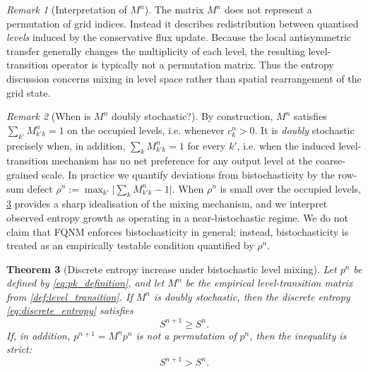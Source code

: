 \documentclass[sn-basic]{sn-jnl}
\theoremstyle{plain}
\newtheorem{theorem}{Theorem}[section]
\theoremstyle{remark}
\newtheorem{remark}[theorem]{Remark}
\begin{document}
\begin{remark}[Interpretation of $M^n$]
\label{rem:M_interpretation}
The matrix $M^n$ does not represent a permutation of grid indices. 
Instead it describes redistribution between quantised \emph{levels} induced by the conservative flux update.
Because the local antisymmetric transfer generally changes the multiplicity of each level, the resulting level-transition operator is typically not a permutation matrix. 
Thus the entropy discussion concerns mixing in level space rather than spatial rearrangement of the grid state.
\end{remark}

\begin{remark}[When is $M^n$ doubly stochastic?]
\label{rem:doubly_stochastic_condition}
By construction, $M^n$ satisfies $\sum_{k'} M_{k'k}^n=1$ on the occupied levels, i.e. whenever $c_k^n>0$. It is \emph{doubly} stochastic precisely when, in addition, $\sum_k M_{k'k}^n=1$ for every $k'$, i.e. when the induced level-transition mechanism has no net preference for any output level at the coarse-grained scale.
In practice we quantify deviations from bistochasticity by the row-sum defect
\(\rho^n := \max_{k'}\big|\sum_k M_{k'k}^n-1\big|\).
When \(\rho^n\) is small over the occupied levels, \cref{thm:entropy_increase} provides a sharp idealisation of the mixing mechanism, and we interpret observed entropy growth as operating in a near-bistochastic regime.
We do not claim that FQNM enforces bistochasticity in general; instead, bistochasticity is treated as an empirically testable condition quantified by \(\rho^n\).
\end{remark}

\begin{theorem}[Discrete entropy increase under bistochastic level mixing]
\label{thm:entropy_increase}
Let $p^n$ be defined by \cref{eq:pk_definition}, and let $M^n$ be the empirical level-transition matrix from \cref{def:level_transition}. If $M^n$ is doubly stochastic, then the discrete entropy \cref{eq:discrete_entropy} satisfies
\begin{equation}
S^{n+1} \ge S^n.
\label{eq:entropy_monotone}
\end{equation}
If, in addition, $p^{n+1}=M^n p^n$ is not a permutation of $p^n$, then the inequality is strict:
\begin{equation}
S^{n+1} > S^n.
\label{eq:entropy_strict}
\end{equation}
\end{theorem}
\end{document}
